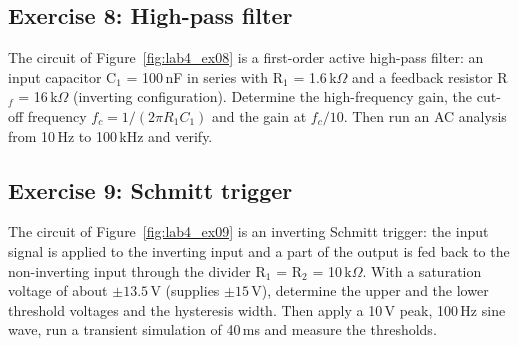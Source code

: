 

\subsection{Exercise 8: High-pass filter}
The circuit of Figure~\ref{fig:lab4_ex08} is a first-order active high-pass filter: an input capacitor C$_1$ = 100\,nF in series with R$_1$ = 1.6\,k$\Omega$ and a feedback resistor R$_f$ = 16\,k$\Omega$ (inverting configuration). Determine the high-frequency gain, the cut-off frequency $f_c=1/(2\pi R_1C_1)$ and the gain at $f_c/10$. Then run an AC analysis from 10\,Hz to 100\,kHz and verify.






\subsection{Exercise 9: Schmitt trigger}
The circuit of Figure~\ref{fig:lab4_ex09} is an inverting Schmitt trigger: the input signal is applied to the inverting input and a part of the output is fed back to the non-inverting input through the divider R$_1$ = R$_2$ = 10\,k$\Omega$. With a saturation voltage of about $\pm13.5$\,V (supplies $\pm15$\,V), determine the upper and the lower threshold voltages and the hysteresis width. Then apply a 10\,V peak, 100\,Hz sine wave, run a transient simulation of 40\,ms and measure the thresholds.


